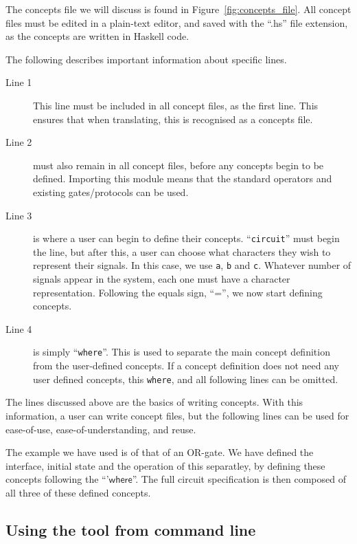 \documentclass[british,conference,compsoc]{IEEEtran}
\begin{document}
The concepts file we will discuss is found in Figure~\ref{fig:concepts_file}.
All concept files must be edited in a plain-text editor, and saved with the 
``.hs'' file extension, as the concepts are written in Haskell code. 

The following describes important information about specific lines.

\begin{description}
  \item [Line 1]
  This line must be included in all concept files, as the first line. This 
  ensures that when translating, this is recognised as a concepts file.
  
  \item [Line 2] must also remain in all concept files, before any concepts 
  begin to be defined. Importing this module means that the standard operators 
  and existing gates/protocols can be used. 
  
  \item [Line 3] is where a user can begin to define their concepts. 
  ``\texttt{circuit}'' must begin the line, but after this, a user can choose 
  what characters they wish to represent their signals. In this case, we use 
  \texttt{a}, \texttt{b} and \texttt{c}. Whatever number of signals appear in 
  the system, each one must have a character representation. Following the 
  equals sign, ``='', we now start defining concepts.
  
  \item [Line 4] is simply ``\texttt{where}''. This is used to separate the main
  concept definition from the user-defined concepts. If a concept definition 
  does not need any user defined concepts, this \texttt{where}, and all 
  following lines can be omitted.

\end{description}

The lines discussed above are the basics of writing concepts. With this 
information, a user can write concept files, but the following lines can be 
used for ease-of-use, ease-of-understanding, and reuse. 

The example we have used is of that of an OR-gate. We have defined the 
interface, initial state and the operation of this separatley, by defining 
these concepts following the ``'$\mathsf{where}$''. The full circuit 
specification is then composed of all three of these defined concepts. 

\subsection{Using the tool from command line}
\end{document}
